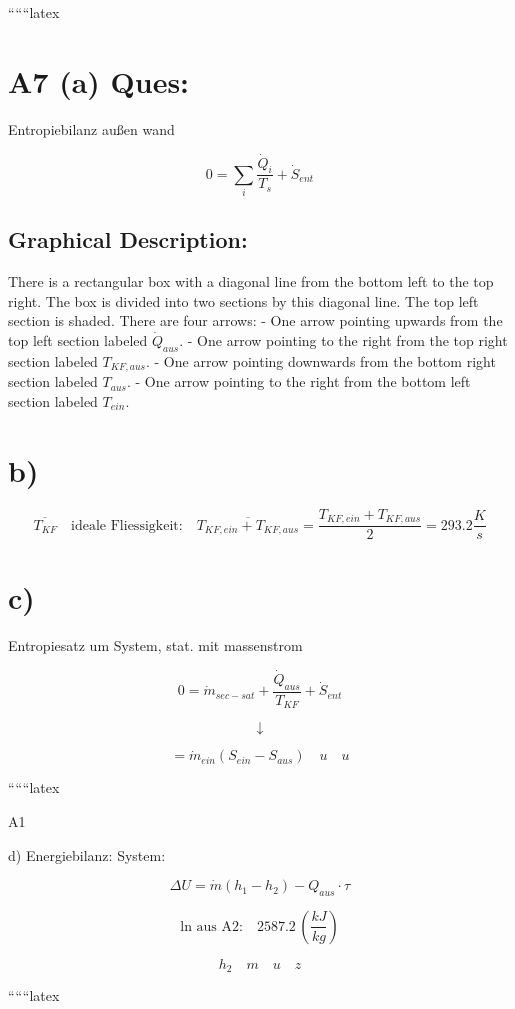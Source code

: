 
``````latex


\section*{A7 (a) Ques:}
Entropiebilanz außen wand

\[
0 = \sum_i \frac{\dot{Q}_i}{T_s} + \dot{S}_{ent}
\]

\subsection*{Graphical Description:}
There is a rectangular box with a diagonal line from the bottom left to the top right. The box is divided into two sections by this diagonal line. The top left section is shaded. There are four arrows:
- One arrow pointing upwards from the top left section labeled $\dot{Q}_{aus}$.
- One arrow pointing to the right from the top right section labeled $T_{KF, aus}$.
- One arrow pointing downwards from the bottom right section labeled $T_{aus}$.
- One arrow pointing to the right from the bottom left section labeled $T_{ein}$.

\section*{b)}
\[
\overline{T_{KF}} \quad \text{ideale Fliessigkeit:} \quad \overline{T_{KF, ein} + T_{KF, aus}} = \frac{T_{KF, ein} + T_{KF, aus}}{2} = 293.2 \frac{K}{s}
\]

\section*{c)}
Entropiesatz um System, stat. mit massenstrom

\[
0 = \dot{m}_{sec-sat} + \frac{\dot{Q}_{aus}}{T_{KF}} + \dot{S}_{ent}
\]

\[
\downarrow
\]

\[
= \dot{m}_{ein} (S_{ein} - S_{aus}) \quad u \quad u
\]

``````latex


A1

d) Energiebilanz: System:

\[
\Delta U = \dot{m} (h_1 - h_2) - Q_{aus} \cdot \tau
\]

\[
\text{ln aus A2:} \quad 2587.2 \, \left( \frac{kJ}{kg} \right)
\]

\[
h_2 \quad m \quad u \quad z
\]

``````latex


